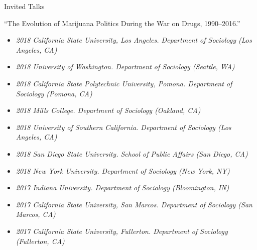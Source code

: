 
\begin{rSection}{Invited Talks}

``The Evolution of Marijuana Politics During the War on Drugs, 1990--2016.''
\vspace*{-.75em} 
\begin{itemize}[leftmargin=.25in]
\item {\footnotesize \it 2018 California State University, Los Angeles. Department of Sociology (Los Angeles, CA)}\vspace*{-.75em} 
\item {\footnotesize \it 2018 University of Washington. Department of Sociology (Seattle, WA)} \vspace*{-.75em} 
\item {\footnotesize \it 2018 California State Polytechnic University, Pomona. Department of Sociology (Pomona, CA)}\vspace*{-.75em} 
\item {\footnotesize \it 2018 Mills College. Department of Sociology (Oakland, CA)} \vspace*{-.75em} 
\item {\footnotesize \it 2018 University of Southern California. Department of Sociology (Los Angeles, CA)} \vspace*{-.75em} 
\item {\footnotesize \it 2018 San Diego State University. School of Public Affairs (San Diego, CA)} \vspace*{-.75em} 
\item {\footnotesize \it 2018 New York University. Department of Sociology (New York, NY)} \vspace*{-.75em} 
\item {\footnotesize \it 2017 Indiana University. Department of Sociology (Bloomington, IN)} \vspace*{-.75em} 
\item {\footnotesize \it 2017 California State University, San Marcos. Department of Sociology (San Marcos, CA)} \vspace*{-.75em} 
\item {\footnotesize \it 2017 California State University, Fullerton. Department of Sociology (Fullerton, CA)}
\end{itemize} 

\end{rSection}



